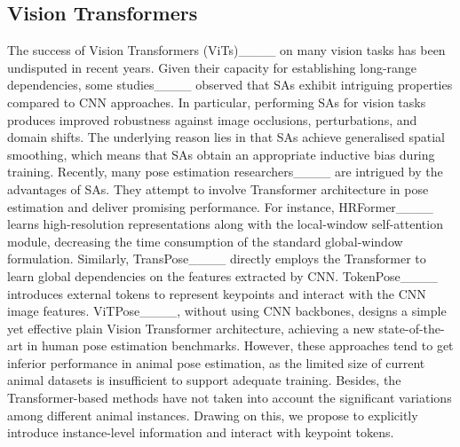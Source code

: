 \subsection{Vision Transformers}
\label{subec:vit}
The success of Vision Transformers (ViTs)____ on many vision tasks has been undisputed in recent years.
Given their capacity for establishing long-range dependencies, some studies____ observed that SAs exhibit intriguing properties compared to CNN approaches.
In particular, performing SAs for vision tasks produces improved robustness against image occlusions, perturbations, and domain shifts.
The underlying reason lies in that SAs achieve generalised spatial smoothing, which means that SAs obtain an appropriate inductive bias during training.
Recently, many pose estimation researchers____ are intrigued by the advantages of SAs.
They attempt to involve Transformer architecture in pose estimation and deliver promising performance.
For instance, HRFormer____ learns high-resolution representations along with the local-window self-attention module, decreasing the time consumption of the standard global-window formulation.
Similarly, TransPose____ directly employs the Transformer to learn global dependencies on the features extracted by CNN.
TokenPose____ introduces external tokens to represent keypoints and interact with the CNN image features.
ViTPose____, without using CNN backbones, designs a simple yet effective plain Vision Transformer architecture, achieving a new state-of-the-art in human pose estimation benchmarks.
However, these approaches tend to get inferior performance in animal pose estimation, as the limited size of current animal datasets is insufficient to support adequate training.
Besides, the Transformer-based methods have not taken into account the significant variations among different animal instances.
Drawing on this, we propose to explicitly introduce instance-level information and interact with keypoint tokens.